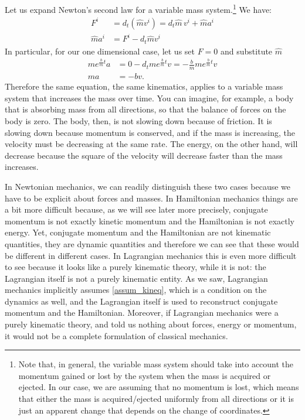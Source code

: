 Let us expand Newton's second law for a variable mass system.\footnote{Note that, in general, the variable mass system should take into account the momentum gained or lost by the system when the mass is acquired or ejected. In our case, we are assuming that no momentum is lost, which means that either the mass is acquired/ejected uniformly from all directions or it is just an apparent change that depends on the change of coordinates.} We have:
\begin{equation}
	\begin{aligned}
		F^i &= d_t (\hat{m}v^i) = d_t \hat{m} \, v^i + \hat{m} a^i \\
		\hat{m} a^i &= F^i - d_t \hat{m} v^i
	\end{aligned}
\end{equation}
In particular, for our one dimensional case, let us set $F=0$ and substitute $\hat{m}$
\begin{equation}
	\begin{aligned}
		m e^{\frac{b}{m}t} a &= 0 - d_t m e^{\frac{b}{m}t} v = -\frac{b}{m} m e^{\frac{b}{m}t} v \\
		ma &= -bv.
	\end{aligned}
\end{equation}
Therefore the same equation, the same kinematics, applies to a variable mass system that increases the mass over time. You can imagine, for example, a body that is absorbing mass from all directions, so that the balance of forces on the body is zero. The body, then, is not slowing down because of friction. It is slowing down because momentum is conserved, and if the mass is increasing, the velocity must be decreasing at the same rate. The energy, on the other hand, will decrease because the square of the velocity will decrease faster than the mass increases.

In Newtonian mechanics, we can readily distinguish these two cases because we have to be explicit about forces and masses. In Hamiltonian mechanics things are a bit more difficult because, as we will see later more precisely, conjugate momentum is not exactly kinetic momentum and the Hamiltonian is not exactly energy. Yet, conjugate momentum and the Hamiltonian are not kinematic quantities, they are dynamic quantities and therefore we can see that these would be different in different cases. In Lagrangian mechanics this is even more difficult to see because it looks like a purely kinematic theory, while it is not: the Lagrangian itself is not a purely kinematic entity. As we saw, Lagrangian mechanics implicitly assumes \ref{assum_kineq}, which is a condition on the dynamics as well, and the Lagrangian itself is used to reconstruct conjugate momentum and the Hamiltonian. Moreover, if Lagrangian mechanics were a purely kinematic theory, and told us nothing about forces, energy or momentum, it would not be a complete formulation of classical mechanics.

